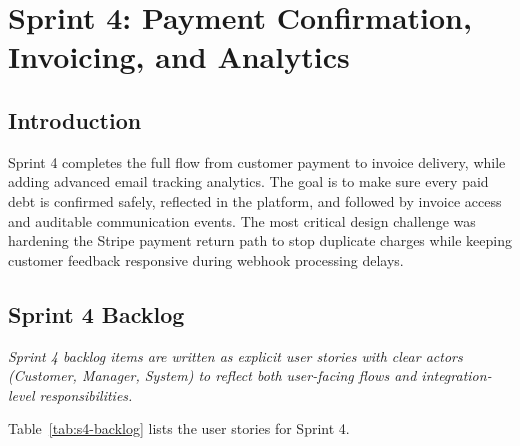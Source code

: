 \documentclass[12pt,a4paper]{report}
\begin{document}
\chapter{Sprint 4: Payment Confirmation, Invoicing, and Analytics}
\label{chap:sprint4}

\section*{Introduction}
{}

Sprint 4 completes the full flow from customer payment to invoice delivery, while
adding advanced email tracking analytics.
The goal is to make sure every paid debt is confirmed safely, reflected in the
platform, and followed by invoice access and auditable communication events.
The most critical design challenge was hardening the Stripe payment return path to
stop duplicate charges while keeping customer feedback responsive during webhook
processing delays.

\section{Sprint 4 Backlog}


\noindent\textit{Sprint 4 backlog items are written as explicit user stories with clear actors (Customer, Manager, System) to reflect both user-facing flows and integration-level responsibilities.}

\medskip

Table~\ref{tab:s4-backlog} lists the user stories for Sprint 4.
\end{document}
